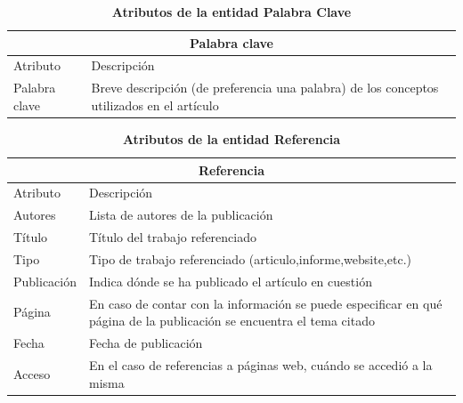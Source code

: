 \begin{table}[!h]
	\centering	
	\caption{\textbf{Atributos de la entidad Palabra Clave}}
	\begin{tabularx}{0.9\linewidth}{lX}
		\toprule
		\multicolumn{2}{c}{\textbf{Palabra clave}}\\
		\midrule
		Atributo&Descripción\\
		\midrule
		Palabra clave&Breve descripción (de preferencia una palabra) de los conceptos utilizados en el artículo\\
		\bottomrule
	\end{tabularx}
	
	\label{tab:palabra-clave}
\end{table}%

\begin{table}[!h]
	\centering	
	\caption{\textbf{Atributos de la entidad Referencia}}
	\begin{tabularx}{0.9\linewidth}{lX}
		\toprule
		\multicolumn{2}{c}{\textbf{Referencia}}\\
		\midrule
		Atributo&Descripción\\
		\midrule
		Autores&Lista de autores de la publicación\\
		Título&Título del trabajo referenciado\\
		Tipo&Tipo de trabajo referenciado (articulo,informe,website,etc.)\\
		Publicación&Indica dónde se ha publicado el artículo en cuestión\\
		Página&En caso de contar con la información se puede especificar en qué página de la publicación se encuentra el tema citado\\
		Fecha&Fecha de publicación\\
		Acceso&En el caso de referencias a páginas web, cuándo se accedió a la misma\\
		\bottomrule
	\end{tabularx}
	
	\label{tab:referencia}
\end{table}%

